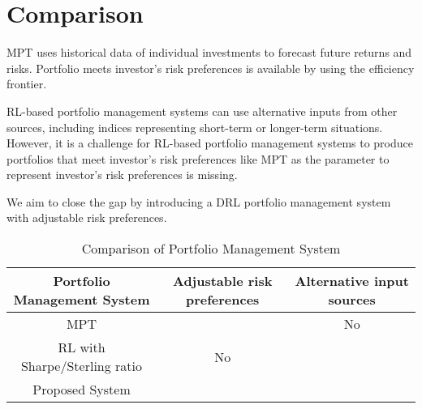 \section{Comparison}
MPT uses historical data of individual investments to forecast future returns and risks. Portfolio meets investor's risk preferences is available by using the efficiency frontier.
\par
RL-based portfolio management systems can use alternative inputs from other sources, including indices representing short-term or longer-term situations. However, it is a challenge for RL-based portfolio management systems to produce portfolios that meet investor's risk preferences like MPT as the parameter to represent investor's risk preferences is missing. 
\par
We aim to close the gap by introducing a DRL portfolio management system with adjustable risk preferences.
\begin{table}[hbt]
    \centering
    \begin{tabular}{|| c|| c | c || }
    \hline \hline
    Portfolio Management System & Adjustable risk preferences & Alternative input sources \\     \hline \hline
    MPT & \color{blue}{Yes} & No \\  \hline
    RL with Sharpe/Sterling ratio& No & \color{blue}{Yes}  \\  \hline
    Proposed System & \color{blue}{Yes} & \color{blue}{Yes} \\   \hline \hline
    \end{tabular}
    \caption{Comparison of Portfolio Management System}
    \label{tab:comparison_portfolio_system}
\end{table}